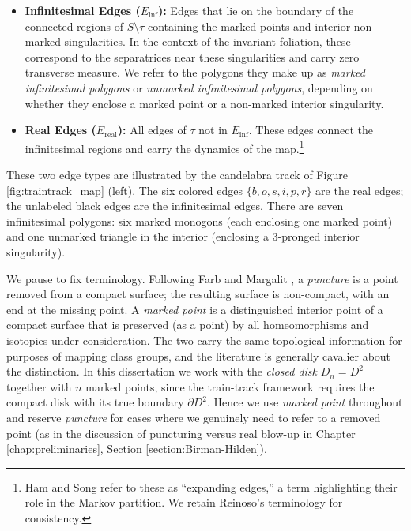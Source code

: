 \begin{itemize}
    \item \textbf{Infinitesimal Edges ($E_{\text{inf}}$):} Edges that lie on the boundary of the connected regions of $S\setminus \tau$ containing the marked points and interior non-marked singularities. In the context of the invariant foliation, these correspond to the separatrices near these singularities and carry zero transverse measure. We refer to the polygons they make up as \emph{marked infinitesimal polygons} or \emph{unmarked infinitesimal polygons}, depending on whether they enclose a marked point or a non-marked interior singularity.
    \item \textbf{Real Edges ($E_{\text{real}}$):} All edges of $\tau$ not in $E_{\text{inf}}$. These edges connect the infinitesimal regions and carry the dynamics of the map.\footnote{Ham and Song \cite{HamSong2007} refer to these as ``expanding edges,'' a term highlighting their role in the Markov partition. We retain Reinoso's terminology for consistency.}
\end{itemize}

These two edge types are illustrated by the candelabra track of Figure \ref{fig:traintrack_map} (left). The six colored edges $\{b, o, s, i, p, r\}$ are the real edges; the unlabeled black edges are the infinitesimal edges. There are seven infinitesimal polygons: six marked monogons (each enclosing one marked point) and one unmarked triangle in the interior (enclosing a $3$-pronged interior singularity).

\begin{remark}
We pause to fix terminology. Following Farb and Margalit \cite[Chapter 1]{FarbMargalit2012}, a \emph{puncture} is a point removed from a compact surface; the resulting surface is non-compact, with an end at the missing point. A \emph{marked point} is a distinguished interior point of a compact surface that is preserved (as a point) by all homeomorphisms and isotopies under consideration. The two carry the same topological information for purposes of mapping class groups, and the literature is generally cavalier about the distinction. In this dissertation we work with the \emph{closed disk} $D_n = D^2$ together with $n$ marked points, since the train-track framework requires the compact disk with its true boundary $\partial D^2$. Hence we use \emph{marked point} throughout and reserve \emph{puncture} for cases where we genuinely need to refer to a removed point (as in the discussion of puncturing versus real blow-up in Chapter \ref{chap:preliminaries}, Section \ref{section:Birman-Hilden}).
\end{remark}

